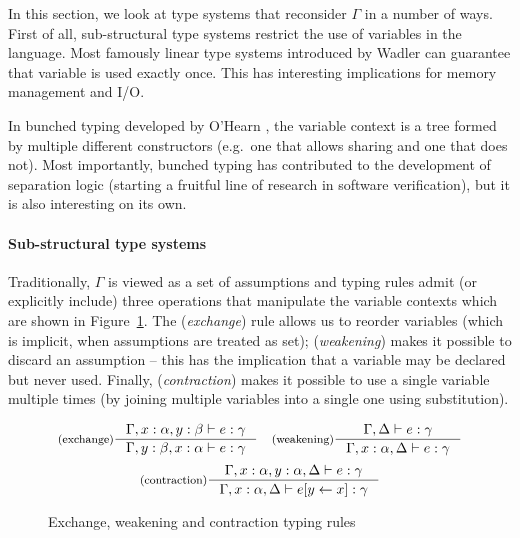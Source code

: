 In this section, we look at type systems that reconsider $\Gamma$ in a number of ways. 
First of all, sub-structural type systems \cite{substruct-attpl-intro} restrict the use of variables
in the language. Most famously linear type systems introduced by Wadler \cite{substruct-linear-change} 
can guarantee that variable is used exactly once. This has interesting implications for memory
management and I/O. 

In bunched typing developed by O'Hearn \cite{substruct-bunched}, the variable context is a tree 
formed by multiple different constructors (e.g.~one that allows sharing and one that does not). 
Most importantly, bunched typing has contributed to the development of separation logic
\cite{substruct-separation-logic} (starting a fruitful line of research in software verification), 
but it is also interesting on its own. 


\paragraph{Sub-structural type systems}

Traditionally, $\Gamma$ is viewed as a set of assumptions and typing rules admit (or explicitly
include) three operations that manipulate the variable contexts which are shown in 
Figure~\ref{fig:substructural-rules}. The (\emph{exchange}) rule allows us to reorder variables
(which is implicit, when assumptions are treated as set); (\emph{weakening}) makes it possible
to discard an assumption -- this has the implication that a variable may be declared but never
used. Finally, (\emph{contraction}) makes it possible to use a single variable multiple times
(by joining multiple variables into a single one using substitution).

\begin{figure}
\begin{equation*}
\inference[(exchange)]
  {\Gamma, x:\alpha, y:\beta \vdash e : \gamma}
  {\Gamma, y:\beta, x:\alpha \vdash e : \gamma}
\quad
\inference[(weakening)]
  {\Gamma, \Delta \vdash e : \gamma}
  {\Gamma, x:\alpha, \Delta \vdash e : \gamma}
\end{equation*}
\begin{equation*}
\inference[(contraction)]
  {\Gamma, x:\alpha, y:\alpha, \Delta \vdash e : \gamma}
  {\Gamma, x:\alpha, \Delta \vdash \subst{e}{y}{x} : \gamma}
\end{equation*}

\caption{Exchange, weakening and contraction typing rules}
\label{fig:substructural-rules}
\end{figure}

